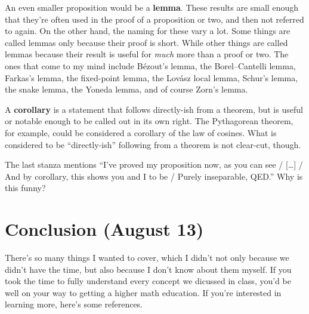 \documentclass[11pt,paper=letter]{scrartcl}
\renewcommand{\bluebf}[1]{{\bfseries \color{Blue} #1}}
\begin{document}
An even smaller proposition would be a \textbf{lemma}. These results are small enough that they're often used in the proof of a proposition or two, and then not referred to again. On the other hand, the naming for these vary a lot. Some things are called lemmas only because their proof is short. While other things are called lemmas because their result is useful for \textit{much} more than a proof or two. The ones that come to my mind include B\'ezout's lemma, the Borel--Cantelli lemma, Farkas's lemma, the fixed-point lemma, the Lov\'asz local lemma, Schur's lemma, the snake lemma, the Yoneda lemma, and of course Zorn's lemma.

A \bluebf{corollary} is a statement that follows directly-ish from a theorem, but is useful or notable enough to be called out in its own right. The Pythagorean theorem, for example, could be considered a corollary of the law of cosines. What is considered to be ``directly-ish'' following from a theorem is not clear-cut, though.

\begin{exrboxed}
  The last stanza mentions ``I've proved my proposition now, as you can see / [\dots] / And by corollary, this shows you and I to be / Purely inseparable, QED.'' Why is this funny?
\end{exrboxed}

\section{Conclusion (August 13)}

There's so many things I wanted to cover, which I didn't not only because we didn't have the time, but also because I don't know about them myself. If you took the time to fully understand every concept we dicussed in class, you'd be well on your way to getting a higher math education. If you're interested in learning more, here's some references.
\end{document}
